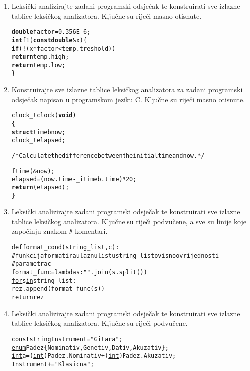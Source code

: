 \documentclass[times, 12pt, utf8]{book}
\begin{document}
\begin{enumerate}[resume]
\item
Leksički analizirajte zadani programski odsječak te konstruirati sve izlazne tablice leksičkog analizatora.
Ključne su riječi masno otisnute. \cite[str.~51]{udzbenik} \cite{auditorne}

\begin{alltt}
\textbf{double} factor = 0.356E-6;
\textbf{int} f1(\textbf{const} \textbf{double} &x) \verb|{|
  \textbf{if} (!(x*factor< temp.treshold))
    \textbf{return} temp.high;
  \textbf{return} temp.low;
\verb|}|
\end{alltt} 

\item
Konstruirajte sve izlazne tablice leksičkog analizatora za zadani programski odsječak napisan u programskom jeziku C.
Ključne su riječi masno otisnute. \cite[str.~51]{udzbenik} \cite{auditorne}

\begin{alltt}
clock_t clock (\textbf{void})
\verb|{|
  \textbf{struct} timeb now;
  clock_t elapsed;
 
  /* Calculate the difference between the initial time and now. */
 
  ftime(&now);
  elapsed=(now.time-_itimeb.time)*20;
  \textbf{return}(elapsed);
\verb|}|
\end{alltt} 

\item
Leksički analizirajte zadani programski odsječak te konstruirati sve izlazne tablice leksičkog analizatora.
Ključne su riječi podvučene, a sve su linije koje započinju znakom \texttt{\#} komentari. \cite[str.~51]{udzbenik} \cite{auditorne}

\begin{alltt}
\underline{def} format_cond(string_list, c):
  # funkcija formatira ulaznu listu string_list ovisno o vrijednosti
  # parametra c
  format_func = \underline{lambda} s: " ".join(s.split())
  \underline{for} s \underline{in} string_list:
    rez.append(format_func(s))
  \underline{return} rez
\end{alltt} 

\item
Leksički analizirajte zadani programski odsječak te konstruirati sve izlazne tablice leksičkog analizatora.
Ključne su riječi podvučene. \cite[str.~51]{udzbenik} \cite{auditorne}

\begin{alltt}
\underline{const} \underline{string} Instrument = "Gitara";
\underline{enum} Padez \verb|{| Nominativ, Genetiv, Dativ, Akuzativ \verb|}|;
\underline{int} a = (\underline{int}) Padez.Nominativ + (\underline{int}) Padez. Akuzativ;
Instrument += "Klasicna";
\end{alltt} 


\end{enumerate}
\end{document}
